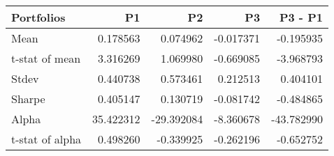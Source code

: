 \begin{tabular}{lrrrr}
\toprule
Portfolios & P1 & P2 & P3 & P3 - P1 \\
\midrule
Mean & 0.178563 & 0.074962 & -0.017371 & -0.195935 \\
t-stat of mean & 3.316269 & 1.069980 & -0.669085 & -3.968793 \\
Stdev & 0.440738 & 0.573461 & 0.212513 & 0.404101 \\
Sharpe & 0.405147 & 0.130719 & -0.081742 & -0.484865 \\
Alpha & 35.422312 & -29.392084 & -8.360678 & -43.782990 \\
t-stat of alpha & 0.498260 & -0.339925 & -0.262196 & -0.652752 \\
\bottomrule
\end{tabular}
